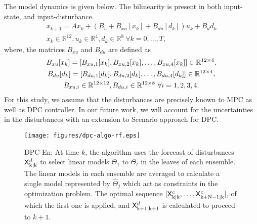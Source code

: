 The model dynamics is given below. The bilinearity is present in both input-state, and input-disturbance.
\begin{gather}
\label{E:bilinear1}
x_{k+1} = Ax_{k}+(B_u +B_{xu}[x_k] + B_{du}[d_k]) u_k+B_dd_k \\
x_{k} \in \mathbb{R}^{12}, u_{k} \in \mathbb{R}^{4}, d_{k} \in \mathbb{R}^{8} \ \forall k = 0,\dots,T, \nonumber
\end{gather}
where, the matrices $B_{xu}$ and $B_{du}$ are defined as
\begin{gather}
\label{E:bilinear2}
B_{xu}[x_k] = [ B_{xu,1}[x_k],B_{xu,2}[x_k], \dots, B_{xu,4}[x_k] ] \in \mathbb{R}^{12\times4}, \nonumber\\
B_{du}[d_k] = [ B_{du,1}[d_k],B_{du,2}[d_k], \dots, B_{du,4}[d_k] ] \in \mathbb{R}^{12\times4}\nonumber, \\
B_{xu,i} \in \mathbb{R}^{12\times12}, B_{du,i} \in \mathbb{R}^{12\times8} \ \forall i=1,2,3,4.\nonumber
\end{gather}
For this study, we assume that the disturbances are precisely known to MPC as well as DPC controller. In our future work, we will account for the uncertainties in the disturbances with an extension to Scenario approach \cite{Bernardini2009} for DPC.

\begin{figure}[t!]
	\centering
	\texttt{[image: figures/dpc-algo-rf.eps]}
	\caption{DPC-En: At time $k$, the algorithm uses the forecast of disturbances $\mathsf{X}^d_{\mathrm{k|k}}$ to select linear models $\Theta_1$ to $\Theta_t$ in the leaves of each ensemble. The linear models in each ensemble are averaged to calculate a single model represented by $\hat{\Theta}_j$ which act as constraints in the optimization problem. The optimal sequence $[\mathsf{X}^c_{\mathrm{k|k}},\dots,\mathsf{X}^c_{\mathrm{k+N-1|k}}]$, of which the first one is applied, and $\mathsf{X}^d_{\mathrm{k+1|k+1}}$ is calculated to proceed to $k+1$.}
	\label{F:dpc-algo-rf}
\end{figure}